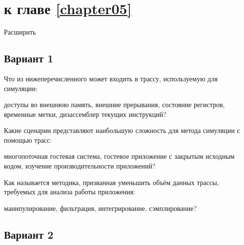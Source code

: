 \section{\Questions к главе \ref{chapter05}} %

\todo Расширить

\subsection*{Вариант 1}

\begin{questions}

\question[3] Что из нижеперечисленного может входить в трассу, используемую для симуляции:
\begin{choices}
    \correctchoice доступы во внешнюю память,
    \correctchoice внешние прерывания,
    \choice состояние регистров,
    \correctchoice временные метки,
    \choice дизассемблер текущих инструкций?
\end{choices}

\question[3] Какие сценарии представляют наибольшую сложность для метода симуляции с помощью трасс:
\begin{choices}
\correctchoice многопоточная гостевая система,
\choice гостевое приложение с закрытым исходным кодом,
\choice изучение производительности приложений?
\end{choices}

\question[3] Как называется методика, призванная уменьшить объём данных трассы, требуемых для анализа работы приложения:
\begin{choices}
\choice манипулирование,
\choice фильтрация,
\choice интегрирование,
\correctchoice сэмплирование?
\end{choices}

\end{questions}

\subsection*{Вариант 2}

